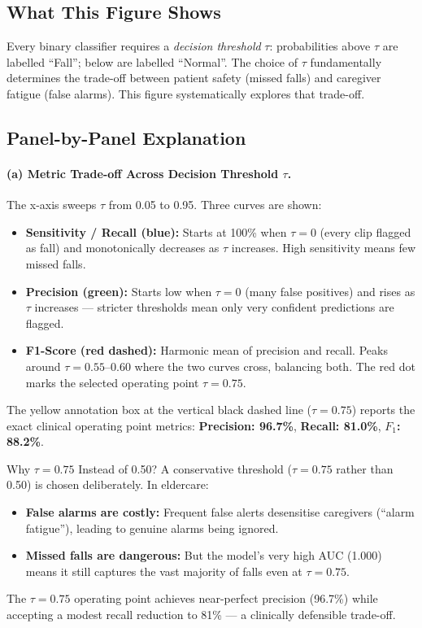 \documentclass[12pt,a4paper]{article}
\begin{document}
\subsection{What This Figure Shows}

Every binary classifier requires a \emph{decision threshold} $\tau$: probabilities above $\tau$ are labelled ``Fall''; below are labelled ``Normal''. The choice of $\tau$ fundamentally determines the trade-off between patient safety (missed falls) and caregiver fatigue (false alarms). This figure systematically explores that trade-off.

\subsection{Panel-by-Panel Explanation}

\paragraph{(a) Metric Trade-off Across Decision Threshold $\tau$.}
The x-axis sweeps $\tau$ from 0.05 to 0.95. Three curves are shown:
\begin{itemize}[itemsep=2pt]
    \item \textbf{Sensitivity / Recall (blue):} Starts at 100\% when $\tau{=}0$ (every clip flagged as fall) and monotonically decreases as $\tau$ increases. High sensitivity means few missed falls.
    \item \textbf{Precision (green):} Starts low when $\tau{=}0$ (many false positives) and rises as $\tau$ increases — stricter thresholds mean only very confident predictions are flagged.
    \item \textbf{F1-Score (red dashed):} Harmonic mean of precision and recall. Peaks around $\tau{=}0.55$–0.60 where the two curves cross, balancing both. The red dot marks the selected operating point $\tau{=}0.75$.
\end{itemize}
The yellow annotation box at the vertical black dashed line ($\tau{=}0.75$) reports the exact clinical operating point metrics: \textbf{Precision: 96.7\%}, \textbf{Recall: 81.0\%}, \textbf{$F_1$: 88.2\%}.

\begin{keybox}{Why $\tau = 0.75$ Instead of 0.50?}
A conservative threshold ($\tau{=}0.75$ rather than 0.50) is chosen deliberately. In eldercare:
\begin{itemize}[itemsep=1pt]
    \item \textbf{False alarms are costly:} Frequent false alerts desensitise caregivers (``alarm fatigue''), leading to genuine alarms being ignored.
    \item \textbf{Missed falls are dangerous:} But the model's very high AUC (1.000) means it still captures the vast majority of falls even at $\tau{=}0.75$.
\end{itemize}
The $\tau{=}0.75$ operating point achieves near-perfect precision (96.7\%) while accepting a modest recall reduction to 81\% — a clinically defensible trade-off.
\end{keybox}
\end{document}
